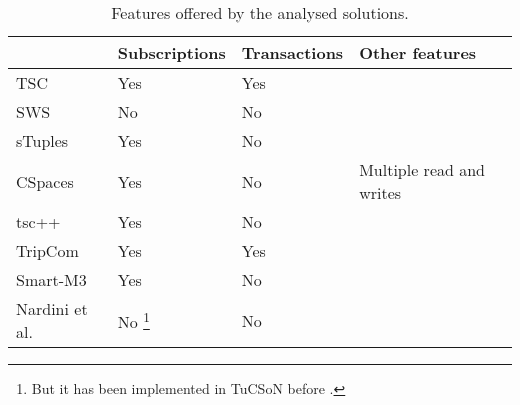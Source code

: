 
\begin{table}[htbp]
\caption{Features offered by the analysed solutions.}

\begin{tabular}{ l p{3cm} l p{4cm} }
\hline 
  & Subscriptions  & Transactions  & Other features \tabularnewline
\hline 
 TSC & Yes  & Yes  &  \tabularnewline
 SWS & No  & No  &  \tabularnewline
 sTuples & Yes  & No  &  \tabularnewline
 CSpaces & Yes  & No  & Multiple read and writes \tabularnewline %
 tsc++ & Yes  & No  &  \tabularnewline
 TripCom & Yes  & Yes  &  \tabularnewline
 Smart-M3 & Yes  & No  &  \tabularnewline
 Nardini et al. & No \footnote{But it has been implemented in TuCSoN before \cite{ricci_extending_2002}.} & No  &  \tabularnewline
\hline 
\end{tabular}
\label{tab:compAdds} 
\end{table}


